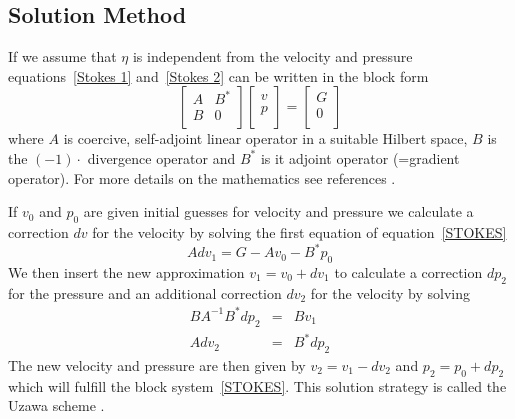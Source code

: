 \subsection{Solution Method \label{STOKES SOLVE}}
If we assume that $\eta$ is independent from the velocity and pressure equations~\ref{Stokes 1} and~\ref{Stokes 2} 
can be written in the block form
\begin{equation}
\left[ \begin{array}{cc}
A     & B^{*} \\
B & 0 \\
\end{array} \right]
\left[ \begin{array}{c}
v \\
p \\
\end{array} \right]
=\left[ \begin{array}{c}
G \\
0 \\
\end{array} \right]
\label{STOKES}
\end{equation}
where $A$ is coercive, self-adjoint linear operator in a suitable Hilbert space, $B$ is the $(-1) \cdot$ divergence operator and $B^{*}$ is it adjoint operator (=gradient operator).
For more details on the mathematics see references \cite{AAMIRBERKYAN2008,MBENZI2005}. 

If $v_{0}$ and $p_{0}$ are given initial guesses for
velocity and pressure we calculate a correction $dv$ for the velocity by solving the first
equation of equation~\ref{STOKES}
 \begin{equation}\label{STOKES ITER STEP 1}
 A dv_{1} = G - A v_{0} - B^{*} p_{0}
\end{equation}
We then insert the new approximation $v_{1}=v_{0}+dv_{1}$ to calculate a correction $dp_{2}$
for the pressure and an additional correction $dv_{2}$ for the velocity by solving
 \begin{equation}
 \begin{array}{rcl}
 B A^{-1} B^{*} dp_{2} & = & Bv_{1} \\
 A dv_{2} & = & B^{*} dp_{2} 
\end{array}
 \label{STOKES ITER STEP 2}
 \end{equation}
The new velocity and pressure are then given by $v_{2}=v_{1}-dv_{2}$ and
$p_{2}=p_{0}+dp_{2}$ which will fulfill the block system~\ref{STOKES}. 
This solution strategy is called the Uzawa scheme . 


